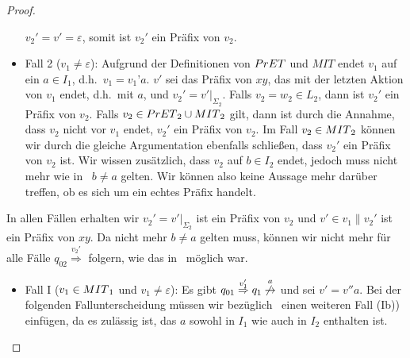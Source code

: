 \begin{proof}
\begin{itemize}
      $v_2'=v'=\varepsilon$, somit ist $v_2'$ ein Präfix von $v_2$.
    \item Fall 2 ($v_1\neq\varepsilon$): Aufgrund der Definitionen von $PrET{}$
      und $MIT$ endet $v_1$ auf ein $a\in I_1$, d.h.\ $v_1=v_1’a$. $v'$ sei das
      Präfix von $xy$, das mit der letzten Aktion von $v_1$ endet, d.h.\ mit
      $a$, und $v_2'=v'|_{\Sigma _{2}}$. Falls $v_2 = w_2\in L_2$, dann ist
      $v_2'$ ein Präfix von $v_2$. Falls $v_2\in
      PrET{}_2\cup MIT{}_2$ gilt, dann ist durch die Annahme, dass $v_2$ nicht vor
      $v_1$ endet, $v_2'$ ein Präfix von $v_2$. Im Fall $v_2\in MIT{}_2$ können
      wir durch die gleiche Argumentation ebenfalls schließen, dass $v_2'$ ein
      Präfix von $v_2$ ist. Wir wissen zusätzlich, dass $v_2$ auf $b\in
      I_2$ endet, jedoch muss nicht mehr wie in~\cite{Vogler2014EIO} $b\neq a$
      gelten. Wir können also keine Aussage mehr darüber treffen, ob es sich um
      ein echtes Präfix handelt.
  \end{itemize}
  In allen Fällen erhalten wir $v_2'=v'|_{\Sigma _2}$ ist ein Präfix von $v_2$
  und $v'\in v_1\| v_2'$ ist ein Präfix von $xy$. Da nicht mehr $b\neq a$
  gelten muss, können wir nicht mehr für alle Fälle
  $q_{02}\overset{v_2'}{\Rightarrow}$ folgern, wie das in~\cite{Vogler2014EIO}
  möglich war.
  \begin{itemize}
    \item Fall I ($v_1\in MIT{}_1$ und $v_1\neq\varepsilon$): Es gibt $q_{01}
      \overset{v_1'}{\Rightarrow}q_1
      \overset{a}{\not{\hspace{-0.1cm}\rightarrow}}$ und sei $v'=v''a$. Bei der
      folgenden Fallunterscheidung müssen wir bezüglich~\cite{Vogler2014EIO}
      einen weiteren Fall (Ib)) einfügen, da es zulässig ist, das $a$ sowohl in
      $I_1$ wie auch in $I_2$ enthalten ist.
\end{itemize}
\end{proof}

